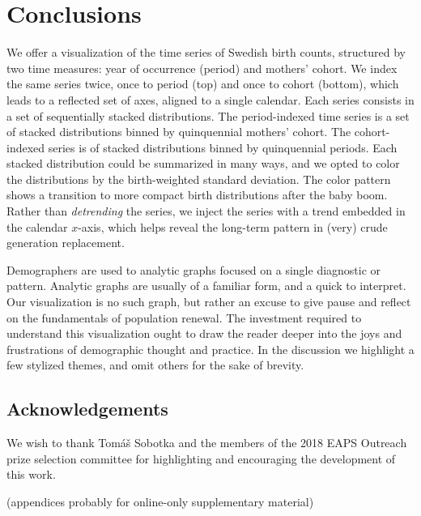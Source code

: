 \documentclass{article}
\begin{document}
\section{Conclusions}
\label{sec:conc}
We offer a visualization of the time series of Swedish birth counts, structured by two time measures: year of occurrence (period) and mothers' cohort. We index the same series twice, once to period (top) and once to cohort (bottom), which leads to a reflected set of axes, aligned to a single calendar. Each series consists in a set of sequentially stacked distributions. The period-indexed time series is a set of stacked distributions binned by quinquennial mothers' cohort. The cohort-indexed series is of stacked distributions binned by quinquennial periods. Each stacked distribution could be summarized in many ways, and we opted to color the distributions by the birth-weighted standard deviation. The color pattern shows a transition to more compact birth distributions after the baby boom. Rather than \emph{detrending} the series, we inject the series with a trend embedded in the calendar $x$-axis, which helps reveal the long-term pattern in (very) crude generation replacement.

Demographers are used to analytic graphs focused on a single diagnostic or pattern. Analytic graphs are usually of a familiar form, and a quick to interpret. Our visualization is no such graph, but rather an excuse to give pause and reflect on the fundamentals of population renewal. The investment required to understand this visualization ought to draw the reader deeper into the joys and frustrations of demographic thought and practice. In the discussion we highlight a few stylized themes, and omit others for the sake of brevity. 

\subsection*{Acknowledgements} We wish to thank Tom\'a\v{s} Sobotka and the members of the 2018 EAPS Outreach prize selection committee for highlighting and encouraging the development of this work.

\FloatBarrier

\pagebreak
\begin{appendix}
(appendices probably for online-only supplementary material)

\end{appendix}
\pagebreak

\theendnotes
\pagebreak

\listoftables
\pagebreak

\listoffigures
\pagebreak

   
\end{document}
